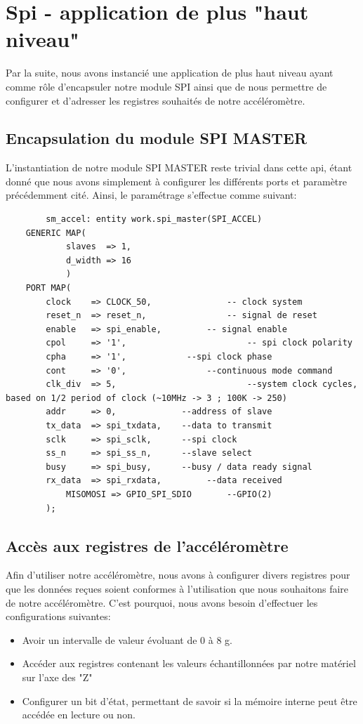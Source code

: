 \documentclass[french,a4paper,12pt]{report}
\begin{document}
	\section{Spi - application de plus "haut niveau"}
		Par la suite, nous avons instancié une application de plus haut niveau ayant comme rôle d'encapsuler notre module SPI ainsi que de nous permettre de configurer et d'adresser les registres souhaités de notre accéléromètre.
		
		\subsection{Encapsulation du module SPI MASTER}
			L'instantiation de notre module SPI MASTER reste trivial dans cette api, étant donné que nous avons simplement à configurer les différents ports et paramètre précédemment cité. Ainsi, le paramétrage s'effectue comme suivant:

	\begin{lstlisting}
 		sm_accel: entity work.spi_master(SPI_ACCEL)
  	GENERIC MAP(
   	 		slaves  => 1,
   	 		d_width => 16
	 		)
  	PORT MAP(
    	clock    => CLOCK_50,				-- clock system
    	reset_n  => reset_n,				-- signal de reset
    	enable   => spi_enable,			-- signal enable
    	cpol     => '1',						-- spi clock polarity
    	cpha     => '1',           	--spi clock phase
    	cont     => '0',         		--continuous mode command
    	clk_div  => 5,							--system clock cycles, based on 1/2 period of clock (~10MHz -> 3 ; 100K -> 250)
    	addr     => 0,             --address of slave
    	tx_data  => spi_txdata,    --data to transmit
    	sclk     => spi_sclk,      --spi clock
    	ss_n     => spi_ss_n,      --slave select
    	busy     => spi_busy,      --busy / data ready signal
    	rx_data  => spi_rxdata,			--data received
	 		MISOMOSI => GPIO_SPI_SDIO		--GPIO(2)
		);
		\end{lstlisting}
		
		\subsection{Accès aux registres de l'accéléromètre}
			Afin d'utiliser notre accéléromètre, nous avons à configurer divers registres pour que les données reçues soient conformes à l'utilisation que nous souhaitons faire de notre accéléromètre. C'est pourquoi, nous avons besoin d'effectuer les configurations suivantes:
			
			\begin{itemize}
				\item Avoir un intervalle de valeur évoluant de 0 à 8 g.
				\item Accéder aux registres contenant les valeurs échantillonnées par notre matériel sur l'axe des "Z"
				\item Configurer un bit d'état, permettant de savoir si la mémoire interne peut être accédée en lecture ou non.				
			\end{itemize}
			
\end{document}
